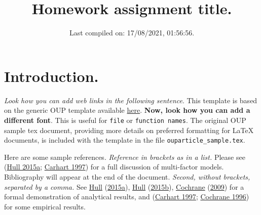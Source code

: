 \documentclass[12pt,halfline,a4paper,]{ouparticle}
\begin{document}
\title{\textbf{Homework assignment title.}}

\author{%
\address{778899}
\and
{}\address{774455}
\and
{}\address{884422}
\and
{}
}


\date{Last compiled on: 17/08/2021, 01:56:56.}


\maketitle



\hypersetup{linkcolor=blue}

\hypertarget{introduction.}{%
\section{Introduction.}\label{introduction.}}

\emph{Look how you can add web links in the following sentence}. This
template is based on the generic OUP template available
\href{https://academic.oup.com/icesjms/pages/General_Instructions}{here}.
\textbf{Now, look how you can add a different font}. This is useful for
\texttt{file} or \texttt{function names}. The original OUP sample tex
document, providing more details on preferred formatting for LaTeX
documents, is included with the template in the file
\texttt{ouparticle\_sample.tex}.

Here are some sample references. \emph{Reference in brackets as in a
list.} Please see (\protect\hyperlink{ref-Hull}{Hull 2015a};
\protect\hyperlink{ref-carhart1997persistence}{Carhart 1997}) for a full
discussion of multi-factor models. Bibliography will appear at the end
of the document. \emph{Second, without brackets, separated by a comma.}
See \protect\hyperlink{ref-Hull}{Hull}
(\protect\hyperlink{ref-Hull}{2015a}),
\protect\hyperlink{ref-Hull2}{Hull}
(\protect\hyperlink{ref-Hull2}{2015b}),
\protect\hyperlink{ref-cochrane2009asset}{Cochrane}
(\protect\hyperlink{ref-cochrane2009asset}{2009}) for a formal
demonstration of analytical results, and
(\protect\hyperlink{ref-carhart1997persistence}{Carhart 1997};
\protect\hyperlink{ref-cochrane1996cross}{Cochrane 1996}) for some
empirical results.
\end{document}
